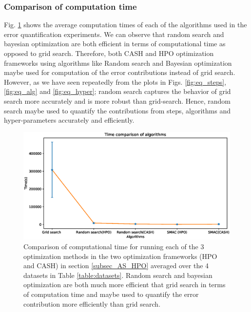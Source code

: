 \subsubsection{Comparison of computation time}
Fig. \ref{fig:time} shows the average computation times of each of the algorithms used in the error quantification experiments. We can observe that random search and bayesian optimization are both efficient in terms of computational time as opposed to grid search.
Therefore, both CASH and HPO optimization frameworks using algorithms like Random search and Bayesian optimization maybe used for computation of the error contributions instead of grid search. However, as we have seen repeatedly from the plots in Figs. \ref{fig:eq_steps}, \ref{fig:eq_alg} and \ref{fig:eq_hyper}; random search captures the behavior of grid search more accurately and is more robust than grid-search. Hence, random search maybe used to quantify the contributions from steps, algorithms and hyper-parameters accurately and efficiently.

\begin{figure}[H]
    \centering
    \includegraphics[scale=0.4]{img/EP/times_algorithms.eps}
    \caption{Comparison of computational time for running each of the 3 optimization methods in the two optimization frameworks (HPO and CASH) in section \ref{subsec_AS_HPO} averaged over the 4 datasets in Table \ref{table:datasets}. Random search and bayesian optimization are both much more efficient that grid search in terms of computation time and maybe used to quantify the error contribution more efficiently than grid search.}
    \label{fig:time}
\end{figure}




